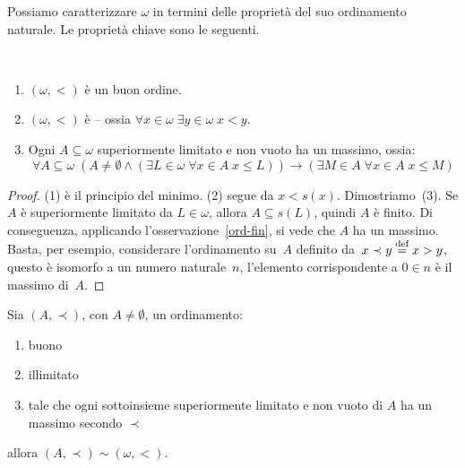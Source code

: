 Possiamo caratterizzare $\omega$ in termini delle propriet\`a del suo
ordinamento naturale. Le propriet\`a chiave sono le seguenti.

\begin{proposition}
\ \\[-2\baselineskip]
	\begin{enumerate}[(1)]
		\item $(\omega,<)$ \`e un buon ordine.
		\item $(\omega,<)$ \`e  -- ossia
$\forall {x \in \omega} \; \exists {y \in \omega} \; x < y$.
		\item Ogni $A \subseteq \omega$ superiormente limitato e non vuoto ha un massimo, ossia:
		\[ \forall {A \subseteq \omega} \; (A \ne \emptyset \land
(\exists {L \in \omega} \; \forall {x \in A} \; x \leq L)) \rightarrow
(\exists {M \in A} \; \forall {x \in A} \; x \leq M)
			\]
	\end{enumerate}
\end{proposition}

\begin{proof}
	(1) \`e il principio del minimo. (2) segue da $x<s(x)$.
Dimostriamo~(3). Se $A$ \`e superiormente limitato da $L \in \omega$,
allora $A \subseteq s(L)$, quindi $A$ \`e finito.
Di conseguenza, applicando l'osservazione~\ref{ord-fin}, si vede che $A$
ha un massimo. {\drkgrn Basta, per esempio, considerare l'ordinamento su~$A$
definito da~$x\prec y \overset{\text{def}}{=} x > y$, questo \`e isomorfo a un numero
naturale~$n$, l'elemento corrispondente a $0\in n$ \`e il massimo di~$A$.}
\end{proof}

\begin{proposition}\label{car-ome}
	Sia $(A,\prec)$, con $A \ne \emptyset$, un ordinamento:
	\begin{enumerate}[(1)]
		\item buono
		\item illimitato
		\item tale che ogni sottoinsieme superiormente limitato e non vuoto di $A$ ha un massimo secondo $\prec$
	\end{enumerate}
	allora $(A,\prec) \sim (\omega,<)$.
\end{proposition}

%
%
%
%

